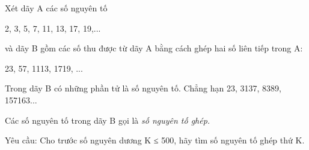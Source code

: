 Xét dãy A các số nguyên tố  

   2, 3, 5, 7, 11, 13, 17, 19,...  

   và dãy B gồm các số thu được từ dãy A bằng cách ghép hai số liên tiếp trong A:  

   23, 57, 1113, 1719, ...  

   Trong dãy B có những phần tử là số nguyên tố. Chẳng hạn 23, 3137, 8389, 157163...  

   Các số nguyên tố trong dãy B gọi là   \textit{    số nguyên tố ghép.   }

   Yêu cầu: Cho trước số nguyên dương K ≤ 500, hãy tìm số nguyên tố ghép thứ K.